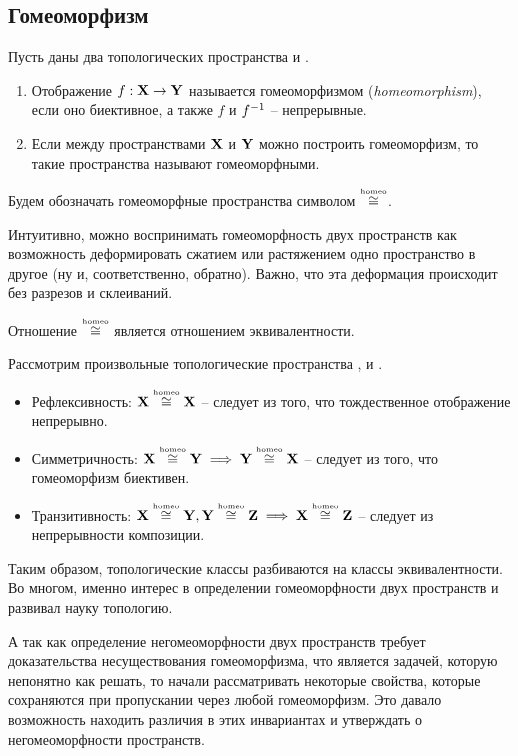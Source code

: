 \subsection{Гомеоморфизм}
\begin{Def}
    Пусть даны два топологических пространства \topX и \topY. 
    \begin{enumerate}
        \item Отображение $f: \mathbf{X}\to \mathbf{Y}$ называется гомеоморфизмом (\textit{homeomorphism}), если оно биективное, а также $f$ и $f^{-1}$ -- непрерывные.
        \item Если между пространствами $\mathbf{X}$ и $\mathbf{Y}$ можно построить гомеоморфизм, то такие пространства называют гомеоморфными. 
    \end{enumerate}
\end{Def}
\begin{Note}
    Будем обозначать гомеоморфные пространства символом $\overset{\text{\tiny homeo}}{\cong}$.
\end{Note}
\begin{Note}
    Интуитивно, можно воспринимать гомеоморфность двух пространств как возможность деформировать сжатием или растяжением одно пространство в другое (ну и, соответственно, обратно). Важно, что эта деформация происходит без разрезов и склеиваний. 
\end{Note}

\begin{Lem}
    Отношение $\overset{\text{\tiny homeo}}{\cong}$ является отношением эквивалентности.
\end{Lem}
\begin{Proof}
    Рассмотрим произвольные топологические пространства \topX, \topY и \topZ.
    \begin{itemize}
        \item Рефлексивность: $\mathbf{X}\overset{\text{\tiny homeo}}{\cong} \mathbf{X}$ -- следует из того, что тождественное отображение непрерывно.
        \item Симметричность: $\mathbf{X} \overset{\text{\tiny homeo}}{\cong} \mathbf{Y} \implies \mathbf{Y} \overset{\text{\tiny homeo}}{\cong} \mathbf{X}$ -- следует из того, что гомеоморфизм биективен. 
        \item Транзитивность: $\mathbf{X} \overset{\text{\tiny homeo}}{\cong} \mathbf{Y}, \mathbf{Y} \overset{\text{\tiny homeo}}{\cong} \mathbf{Z} \implies \mathbf{X} \overset{\text{\tiny homeo}}{\cong} \mathbf{Z}$ -- следует из непрерывности композиции. 
    \end{itemize}
\end{Proof}

Таким образом, топологические классы разбиваются на классы эквивалентности. Во многом, именно интерес в определении гомеоморфности двух пространств и развивал науку топологию. 

А так как определение негомеоморфности двух пространств требует доказательства несуществования гомеоморфизма, что является задачей, которую непонятно как решать, то начали рассматривать некоторые свойства, которые сохраняются при пропускании через любой гомеоморфизм. Это давало возможность находить различия в этих инвариантах и утверждать о негомеоморфности пространств.

